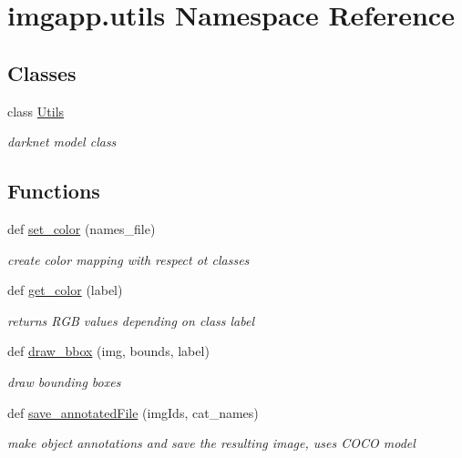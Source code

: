 \hypertarget{namespaceimgapp_1_1utils}{}\section{imgapp.\+utils Namespace Reference}
\label{namespaceimgapp_1_1utils}
\subsection*{Classes}
\begin{DoxyCompactItemize}
\item 
class \hyperlink{classimgapp_1_1utils_1_1Utils}{Utils}
\begin{DoxyCompactList}\small\item\em darknet model class \end{DoxyCompactList}\end{DoxyCompactItemize}
\subsection*{Functions}
\begin{DoxyCompactItemize}
\item 
def \hyperlink{namespaceimgapp_1_1utils_a6d744ddd54588b6d14e6dc10b504e5c3}{set\+\_\+color} (names\+\_\+file)
\begin{DoxyCompactList}\small\item\em create color mapping with respect ot classes \end{DoxyCompactList}\item 
def \hyperlink{namespaceimgapp_1_1utils_a468cc459f9ea6c9c150db800f5d76212}{get\+\_\+color} (label)
\begin{DoxyCompactList}\small\item\em returns R\+GB values depending on class label \end{DoxyCompactList}\item 
def \hyperlink{namespaceimgapp_1_1utils_a7e2ce0fe32d261f7a8c57030029aa401}{draw\+\_\+bbox} (img, bounds, label)
\begin{DoxyCompactList}\small\item\em draw bounding boxes \end{DoxyCompactList}\item 
def \hyperlink{namespaceimgapp_1_1utils_ab0143c8cde7f9ee033d14b55642640f4}{save\+\_\+annotated\+File} (img\+Ids, cat\+\_\+names)
\begin{DoxyCompactList}\small\item\em make object annotations and save the resulting image, uses C\+O\+CO model \end{DoxyCompactList}\end{DoxyCompactItemize}
